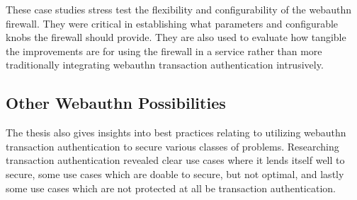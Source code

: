 
These case studies stress test the flexibility and configurability of the webauthn firewall. They were critical in establishing what parameters and configurable knobs the firewall should provide. They are also used to evaluate how tangible the improvements are for using the firewall in a service rather than more traditionally integrating webauthn transaction authentication intrusively. 


\subsection{Other Webauthn Possibilities}

The thesis also gives insights into best practices relating to utilizing webauthn transaction authentication to secure various classes of problems. Researching transaction authentication revealed clear use cases where it lends itself well to secure, some use cases which are doable to secure, but not optimal, and lastly some use cases which are not protected at all be transaction authentication. 



